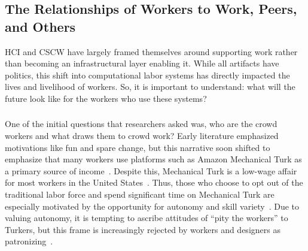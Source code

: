 \documentclass[trackingWork]{subfiles}
\begin{document}
\subsection[What will work and the place of work look like for workers]{The Relationships of Workers to Work, Peers, and Others}
\label{sec:relationships}

HCI and CSCW have largely framed themselves around supporting work rather than becoming an infrastructural layer enabling it. While all artifacts have politics, this shift into computational labor systems has directly impacted the lives and livelihood of workers. So, it is important to understand: what will the future look like for the workers who use these systems?

\subsubsection{\crowdworkpers}
\begin{comment}
	- Workers do it for money
	- Workers coordinate and communicate (gray, being a turker, team stuff). there is mega-drama
	- Workers don't like requesters. have tried to organize
\end{comment}

One of the initial questions that researchers asked was, who are the crowd workers and what draws them to crowd work?
Early literature emphasized motivations like fun and spare change, but this narrative soon shifted to emphasize that many workers use platforms such as Amazon Mechanical Turk as a primary source of income~\cite{kaufmann2011more,ipeirotis2010demographics,Antin2012a}.
Despite this, Mechanical Turk is a low-wage affair for most workers in the United States~\cite{ipeirotis2010demographics,martin2014being,gupta2014turk}.
Thus, those who choose to opt out of the traditional labor force and spend significant time on Mechanical Turk are especially motivated by the opportunity for autonomy and skill variety~\cite{kaufmann2011more}.
Due to valuing autonomy, it is tempting to ascribe attitudes of ``pity the workers'' to Turkers, but this frame is increasingly rejected by workers and designers as patronizing~\cite{storiesIraniSilberman}.


\end{document}
